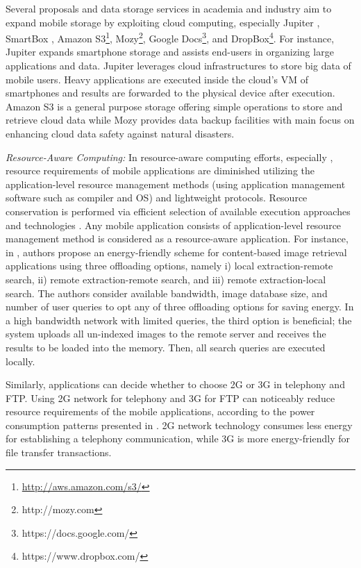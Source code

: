 \documentclass[publish]{IEEEtran}
\begin{document}
Several proposals and data storage services in academia and industry aim to expand mobile storage by exploiting cloud computing, especially Jupiter \cite{Guo2011}, SmartBox \cite{Zheng2010}, Amazon S3\footnote{\url{http://aws.amazon.com/s3/}}, Mozy\footnote{http://mozy.com}, Google Docs\footnote{https://docs.google.com/}, and DropBox\footnote{https://www.dropbox.com/}. For instance, Jupiter expands smartphone storage and assists end-users in organizing large applications and data. Jupiter leverages cloud infrastructures to store big data of mobile users. Heavy applications are executed inside the cloud's VM of smartphones and results are forwarded to the physical device after execution. Amazon S3 is a general purpose storage offering simple operations to store and retrieve cloud data while Mozy provides data backup facilities with main focus on enhancing cloud data safety against natural disasters. 

\textbullet\textit{ Resource-Aware Computing:} In resource-aware computing efforts, especially \cite{Kremer2003, Gurun2003, Ma2012b, Seshasayee2007, Hong2009a}, resource requirements of mobile applications are diminished utilizing the application-level resource management methods (using application management software such as compiler and OS) and lightweight protocols. Resource conservation is performed via efficient selection of available execution approaches and technologies \cite{Gurun2003}. Any mobile application consists of application-level resource management method is considered as a resource-aware application. For instance, in \cite{Hong2009a}, authors propose an energy-friendly scheme for content-based image retrieval applications using three offloading options, namely i) local extraction-remote search, ii) remote extraction-remote search, and iii) remote extraction-local search. The authors consider available bandwidth, image database size, and number of user queries to opt any of three offloading options for saving energy. In a high bandwidth network with limited queries, the third option is beneficial; the system uploads all un-indexed images  to the remote server and receives the results to be loaded into the memory. Then, all search queries are executed locally.

Similarly, applications can decide whether to choose 2G or 3G in telephony and FTP.  Using 2G network for telephony and 3G for FTP can noticeably reduce resource requirements of the mobile applications, according to the power consumption patterns presented in \cite{Perrucci}. 2G network technology consumes less energy for establishing a telephony communication, while 3G is more energy-friendly for file transfer transactions.
\end{document}
